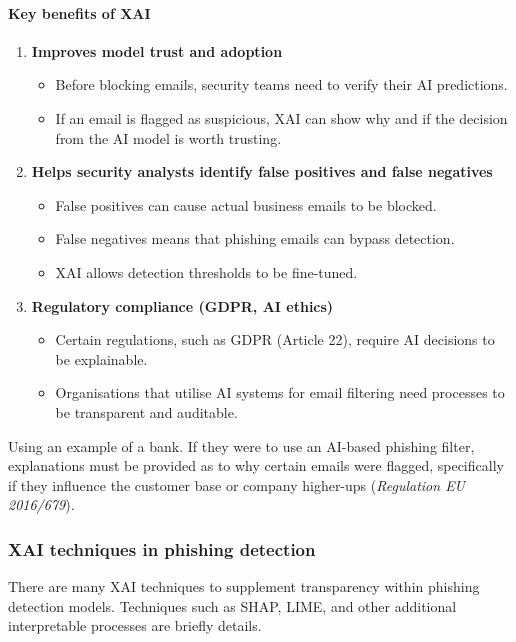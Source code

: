 \paragraph{Key benefits of XAI}
\begin{enumerate}
    \item \textbf{Improves model trust and adoption}
    \begin{itemize}
        \item Before blocking emails, security teams need to verify their AI predictions.
        \item If an email is flagged as suspicious, XAI can show why and if the decision from the AI model is worth trusting.
    \end{itemize}
    \item \textbf{Helps security analysts identify false positives and false negatives}
    \begin{itemize}
        \item False positives can cause actual business emails to be blocked.
        \item False negatives means that phishing emails can bypass detection.
        \item XAI allows detection thresholds to be fine-tuned.
    \end{itemize}
    \item \textbf{Regulatory compliance (GDPR, AI ethics)}
    \begin{itemize}
        \item Certain regulations, such as GDPR (Article 22), require AI decisions to be explainable.
        \item Organisations that utilise AI systems for email filtering need processes to be transparent and auditable.
    \end{itemize}
\end{enumerate}

\noindent Using an example of a bank. If they were to use an AI-based phishing filter, explanations must be provided as to why certain emails were flagged, specifically if they influence the customer base or company higher-ups (\textit{Regulation EU 2016/679}).

\subsubsection*{XAI techniques in phishing detection}
There are many XAI techniques to supplement transparency within phishing detection models. Techniques such as SHAP, LIME, and other additional interpretable processes are briefly details.

